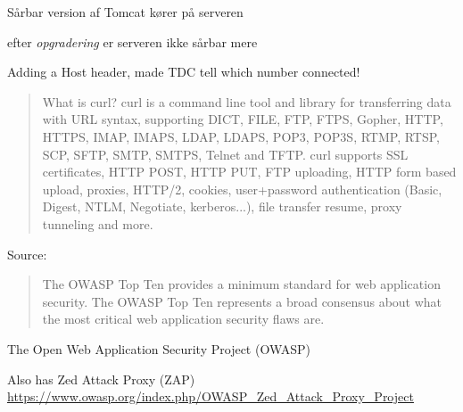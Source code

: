 \documentclass[Screen16to9,17pt]{foils}
\begin{document}


\centerline{Sårbar version af Tomcat kører på serveren}



\centerline{efter \emph{opgradering} er serveren ikke sårbar mere}



Adding a Host header, made TDC tell which number connected!


\begin{quote}\footnotesize
	What is curl?
curl is a command line tool and library for transferring data with URL syntax, supporting DICT, FILE, FTP, FTPS, Gopher, HTTP, HTTPS, IMAP, IMAPS, LDAP, LDAPS, POP3, POP3S, RTMP, RTSP, SCP, SFTP, SMTP, SMTPS, Telnet and TFTP. curl supports SSL certificates, HTTP POST, HTTP PUT, FTP uploading, HTTP form based upload, proxies, HTTP/2, cookies, user+password authentication (Basic, Digest, NTLM, Negotiate, kerberos...), file transfer resume, proxy tunneling and more.
\end{quote}

Source: 




\begin{quote}
The OWASP Top Ten provides a minimum standard for web application
security. The OWASP Top Ten represents a broad consensus about what
the most critical web application security flaws are.
\end{quote}

\begin{list2}
\item The Open Web Application Security Project (OWASP) 
\item Also has Zed Attack Proxy (ZAP) \\
\url{https://www.owasp.org/index.php/OWASP_Zed_Attack_Proxy_Project}
\end{list2}


\end{document}
